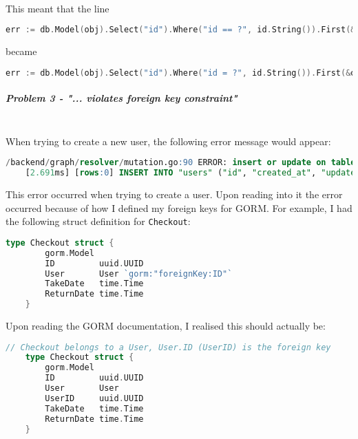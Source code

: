 \documentclass[../../main.tex]{subfiles}
\begin{document}
\noindent \\ This meant that the line

\begin{lstlisting}[language=Go]
        err := db.Model(obj).Select("id").Where("id == ?", id.String()).First(&obj).Error
    \end{lstlisting}

\noindent became

\begin{lstlisting}[language=Go]
        err := db.Model(obj).Select("id").Where("id = ?", id.String()).First(&obj).Error
    \end{lstlisting}

\begin{comment}
POLISH END
\end{comment}

\subparagraph{Problem 3 - "... violates foreign key constraint"}

\noindent \\ When trying to create a new user, the following error message would appear:

\begin{lstlisting}[language=SQL]
    /backend/graph/resolver/mutation.go:90 ERROR: insert or update on table "users" violates foreign key constraint "fk_checkouts_user" (SQLSTATE 23503)
    [2.691ms] [rows:0] INSERT INTO "users" ("id", "created_at", "updated_at", "deleted_at", "first_name", "last_name", "email", "hash") VALUES [..]
    \end{lstlisting}

\noindent This error occurred when trying to create a user. Upon reading into it the error occurred because of how I defined my foreign keys for GORM. For example, I had the following struct definition for \lstinline{Checkout}:

\begin{lstlisting}[language=Go]
    type Checkout struct {
        gorm.Model
        ID         uuid.UUID
        User       User `gorm:"foreignKey:ID"`
        TakeDate   time.Time
        ReturnDate time.Time
    }
    \end{lstlisting}

\noindent Upon reading the GORM documentation, I realised this should actually be:

\begin{lstlisting}[language=Go]
    // Checkout belongs to a User, User.ID (UserID) is the foreign key
    type Checkout struct {
        gorm.Model
        ID         uuid.UUID
        User       User
        UserID     uuid.UUID
        TakeDate   time.Time
        ReturnDate time.Time
    }
    \end{lstlisting}
\end{document}
